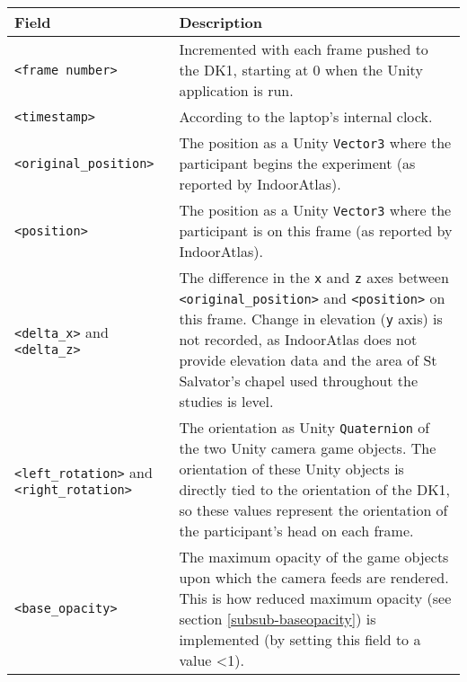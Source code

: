 \begin{center}
\begin{longtable}{ l  p{6.5cm} }

\toprule

\textbf{Field} & \textbf{Description} \\

\midrule

\texttt{<frame number>} & Incremented with each frame pushed to the DK1, starting at 0 when the Unity application is run. \\

\midrule

\texttt{<timestamp>} & According to the laptop's internal clock. \\

\midrule

\texttt{<original\_position>} & The position as a Unity \texttt{Vector3} where the participant begins the experiment (as reported by IndoorAtlas). \\

\midrule

\texttt{<position>} & The position as a Unity \texttt{Vector3} where the participant is on this frame (as reported by IndoorAtlas). \\

\midrule

\texttt{<delta\_x>} and \texttt{<delta\_z>} & The difference in the \texttt{x} and \texttt{z} axes between \texttt{<original\_position>} and \texttt{<position>} on this frame. Change in elevation (\texttt{y} axis) is not recorded, as IndoorAtlas does not provide elevation data and the area of St Salvator's chapel used throughout the studies is level. \\

\midrule

\texttt{<left\_rotation>} and \texttt{<right\_rotation>} & The orientation as Unity \texttt{Quaternion} of the two Unity camera game objects. The orientation of these Unity objects is directly tied to the orientation of the DK1, so these values represent the orientation of the participant's head on each frame. \\

\midrule

\texttt{<base\_opacity>} & The maximum opacity of the game objects upon which the camera feeds are rendered. This is how reduced maximum opacity (see section \ref{subsub-baseopacity}) is implemented (by setting this field to a value \textless 1). \\


\end{longtable}
\end{center}
